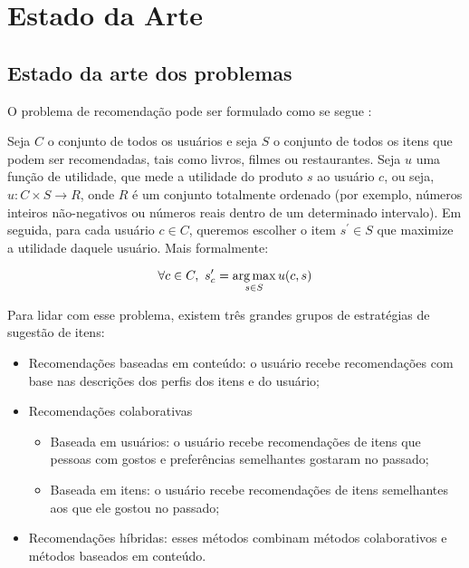 \chapter[Estado da arte]{Estado da Arte}
\label{chap:estado_da_arte}

\section{Estado da arte dos problemas} %
\label{sec:estado_da_arte_dos_problemas}

O problema de recomendação pode ser formulado como se segue \cite{adomavicius2005toward}: 

Seja $C$ o conjunto de todos os usuários e seja $S$ o conjunto de todos os itens que podem ser recomendadas, tais como livros, filmes ou restaurantes. Seja $u$ uma função de utilidade, que mede a utilidade do produto $s$ ao usuário $c$, ou seja, $u: C \times S \rightarrow R$, onde $R$ é um  conjunto totalmente ordenado (por exemplo, números inteiros não-negativos ou números reais dentro de um determinado intervalo). Em seguida, para cada usuário $c \in C$, queremos escolher o item $ s^\prime \in S $ que maximize a utilidade daquele usuário. Mais formalmente:

\begin{equation} 
\forall c \in C, ~ s^\prime_c = \operatorname*{arg\,max}_{s \in S}{u(c,s)}
\end{equation}

Para lidar com esse problema, existem três grandes grupos de estratégias de sugestão de itens:

\begin{itemize}
\item Recomendações baseadas em conteúdo: o usuário recebe recomendações com base nas descrições dos perfis dos itens e do usuário; 
\item Recomendações colaborativas
\begin{itemize}
\item Baseada em usuários: o usuário recebe recomendações de itens que pessoas com gostos e preferências semelhantes gostaram no passado;
\item Baseada em itens: o usuário recebe recomendações de itens semelhantes aos que ele gostou no passado;
\end{itemize}
\item Recomendações híbridas: esses métodos combinam métodos colaborativos e métodos baseados em conteúdo.  
\end{itemize}

